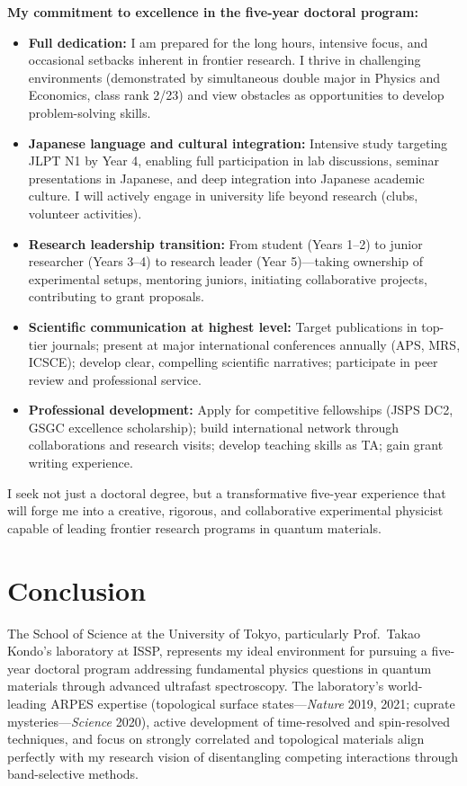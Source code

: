 \documentclass[11pt,a4paper]{article}
\begin{document}
\textbf{My commitment to excellence in the five-year doctoral program:}
\begin{itemize}
    \item \textbf{Full dedication:} I am prepared for the long hours, intensive focus, and occasional setbacks inherent in frontier research. I thrive in challenging environments (demonstrated by simultaneous double major in Physics and Economics, class rank 2/23) and view obstacles as opportunities to develop problem-solving skills.
  
    \item \textbf{Japanese language and cultural integration:} Intensive study targeting JLPT N1 by Year 4, enabling full participation in lab discussions, seminar presentations in Japanese, and deep integration into Japanese academic culture. I will actively engage in university life beyond research (clubs, volunteer activities).
  
    \item \textbf{Research leadership transition:} From student (Years 1--2) to junior researcher (Years 3--4) to research leader (Year 5)—taking ownership of experimental setups, mentoring juniors, initiating collaborative projects, contributing to grant proposals.
  
    \item \textbf{Scientific communication at highest level:} Target publications in top-tier journals; present at major international conferences annually (APS, MRS, ICSCE); develop clear, compelling scientific narratives; participate in peer review and professional service.
  
    \item \textbf{Professional development:} Apply for competitive fellowships (JSPS DC2, GSGC excellence scholarship); build international network through collaborations and research visits; develop teaching skills as TA; gain grant writing experience.
\end{itemize}

I seek not just a doctoral degree, but a transformative five-year experience that will forge me into a creative, rigorous, and collaborative experimental physicist capable of leading frontier research programs in quantum materials.

\section{Conclusion}

The School of Science at the University of Tokyo, particularly Prof.~Takao Kondo's laboratory at ISSP, represents my ideal environment for pursuing a five-year doctoral program addressing fundamental physics questions in quantum materials through advanced ultrafast spectroscopy. The laboratory's world-leading ARPES expertise (topological surface states—\textit{Nature} 2019, 2021; cuprate mysteries—\textit{Science} 2020), active development of time-resolved and spin-resolved techniques, and focus on strongly correlated and topological materials align perfectly with my research vision of disentangling competing interactions through band-selective methods.
\end{document}
